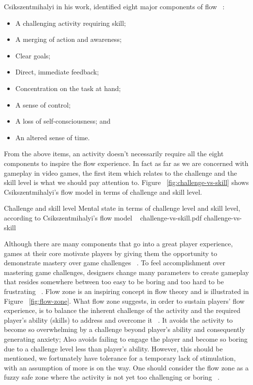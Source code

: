 Csikszentmihalyi in his work, identified eight major components of flow ~\cite{csikszentmihalyi1990flow}:

\begin{itemize}
\item A challenging activity requiring skill;
\item A merging of action and awareness;
\item Clear goals;
\item Direct, immediate feedback;
\item Concentration on the task at hand;
\item A sense of control;
\item A loss of self-consciousness; and
\item An altered sense of time.
\end{itemize}

From the above items, an activity doesn't necessarily require all the eight components to inspire the flow experience. In fact as far as we are concerned with gameplay in video games, the first item which relates to the challenge and the skill level is what we should pay attention to. Figure ~\ref{fig:challenge-vs-skill} shows Csikszentmihalyi's flow model in terms of challenge and skill level.

\img
{Challenge and skill level}
{Mental state in terms of challenge level and skill level, according to Csikszentmihalyi's flow model ~\cite{csikszentmihalyi1997finding}}
{challenge-vs-skill.pdf}
{challenge-vs-skill}

Although there are many components that go into a great player experience, games at their core motivate players by giving them the opportunity to demonstrate mastery over game challenges ~\cite{ryan2006motivational}. To feel accomplishment over mastering game challenges, designers change many parameters to create gameplay that resides somewhere between too easy to be boring and too hard to be frustrating ~\cite{koster2013theory}. Flow zone is an inspiring concept in flow theory and is illustrated in Figure ~\ref{fig:flow-zone}. What flow zone suggests, in order to sustain players' flow experience, is to balance the inherent challenge of the activity and the required player's ability (skills) to address and overcome it ~\cite{chen2007flow}. It avoids the activity to become so overwhelming by a challenge beyond player's ability and consequently generating anxiety; Also avoids failing to engage the player and become so boring due to a challenge level less than player's ability. However, this should be mentioned, we fortunately have tolerance for a temporary lack of stimulation, with an assumption of more is on the way. One should consider the flow zone as a fuzzy safe zone where the activity is not yet too challenging or boring ~\cite{csikszentmihalyi1990flow}.

